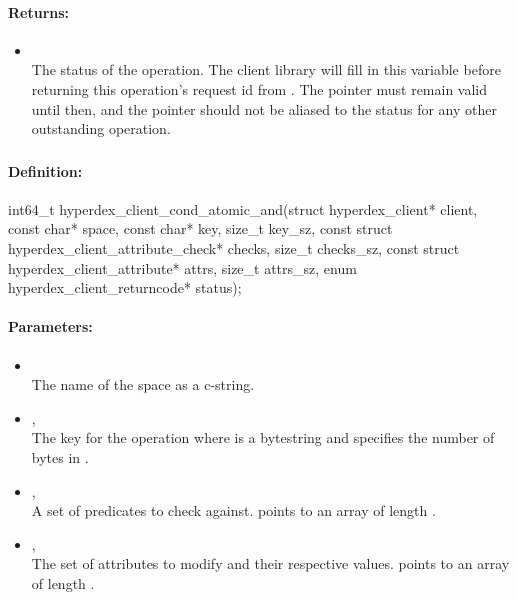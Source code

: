 \paragraph{Returns:}
\begin{itemize}[noitemsep]
\item {}\\
The status of the operation.  The client library will fill in this variable before returning this operation's request id from .  The pointer must remain valid until then, and the pointer should not be aliased to the status for any other outstanding operation.
\end{itemize}

\pagebreak
\subsubsection{}
\label{api:c:cond_atomic_and}


\paragraph{Definition:}
\begin{ccode}
int64_t hyperdex_client_cond_atomic_and(struct hyperdex_client* client,
        const char* space,
        const char* key, size_t key_sz,
        const struct hyperdex_client_attribute_check* checks, size_t checks_sz,
        const struct hyperdex_client_attribute* attrs, size_t attrs_sz,
        enum hyperdex_client_returncode* status);
\end{ccode}

\paragraph{Parameters:}
\begin{itemize}[noitemsep]
\item {}\\
The name of the space as a c-string.
\item {}, \\
The key for the operation where  is a bytestring and  specifies the number of bytes in .
\item {}, \\
A set of predicates to check against.   points to an array of length .
\item {}, \\
The set of attributes to modify and their respective values.   points to an array of length .
\end{itemize}

